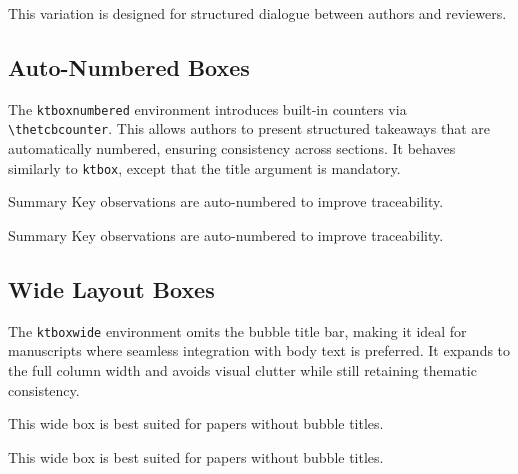 \documentclass[12pt,onecolumn]{article}
\begin{document}
    \begin{ktbox}[theme=gray]
      \begin{codeblock}
\begin{ktbox}[title={Reviewer Comment}]
  This variation is designed for structured dialogue between authors and reviewers.
\end{ktbox}
      \end{codeblock}
    \end{ktbox}


  \subsection{Auto-Numbered Boxes}
  \label{sec:structural-numbered}
    The \texttt{ktboxnumbered} environment introduces built-in counters via \verb|\thetcbcounter|. This allows authors to present structured takeaways that are automatically numbered, ensuring consistency across sections. It behaves similarly to \texttt{ktbox}, except that the title argument is mandatory.

    \begin{ktboxnumbered}{Summary}
      Key observations are auto-numbered to improve traceability.
    \end{ktboxnumbered}

    \begin{ktbox}[theme=gray]
      \begin{codeblock}
\begin{ktboxnumbered}{Summary}
  Key observations are auto-numbered to improve traceability.
\end{ktboxnumbered}
      \end{codeblock}
    \end{ktbox}

  \subsection{Wide Layout Boxes}
  \label{sec:structural-wide}
    The \texttt{ktboxwide} environment omits the bubble title bar, making it ideal for manuscripts where seamless integration with body text is preferred. It expands to the full column width and avoids visual clutter while still retaining thematic consistency.

\begin{ktboxwide}[theme=orange]
  This wide box is best suited for papers without bubble titles.
\end{ktboxwide}

    \begin{ktbox}[theme=gray]
      \begin{codeblock}
\begin{ktboxwide}[theme=orange]
  This wide box is best suited for papers without bubble titles.
\end{ktboxwide}
      \end{codeblock}
    \end{ktbox}
\end{document}
